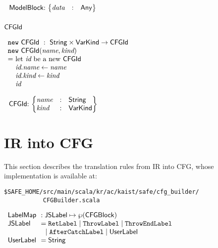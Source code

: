 \noindent
$
\begin{array}{@{~}r@{~}l@{}l@{~}l}
\\
& \ModelBlock & : &
\begin{Bmatrix*}[l]
\emph{data} & : & \Any \\
\end{Bmatrix*}\\
\end{array}
$

\subsubsection{$\mbox{\textsf{CFGId}}$}
$
\begin{array}{l@{}l@{~}l}
\lefteqn{\new \ \CFGId \ : \ \String \times \VarKind \rightarrow \CFGId}\\
\lefteqn{\new\ \CFGId(\emph{name}, \emph{kind})}\\
& = & \text{let } \emph{id} \text{ be a new } \CFGId\\
& & \emph{id}.\emph{name} \leftarrow \emph{name} \\
& & \emph{id}.\emph{kind} \leftarrow \emph{kind} \\
& & \emph{id}\\
\end{array}
$

\noindent
$
\begin{array}{@{~}r@{~}l@{}l@{~}l}
& \CFGId & : &
\begin{Bmatrix*}[l]
\emph{name} & : & \String\\
\emph{kind} & : & \VarKind\\
\end{Bmatrix*}\\
\end{array}
$

\section{IR into CFG}
This section describes the \safe translation rules from IR into CFG,
whose implementation is available at:
\begin{verbatim}
$SAFE_HOME/src/main/scala/kr/ac/kaist/safe/cfg_builder/
           CFGBuilder.scala
\end{verbatim}

\noindent
$
\begin{array}{l@{~~}l}
\LabelMap &: \JSLabel \mapsto \powerset{\CFGBlock}\\
\JSLabel &= \RetLabel \mid \ThrowLabel \mid \ThrowEndLabel \\
& \ \ \mid \AfterCatchLabel \mid \UserLabel\\
\UserLabel &= \String\\
\end{array}
$

